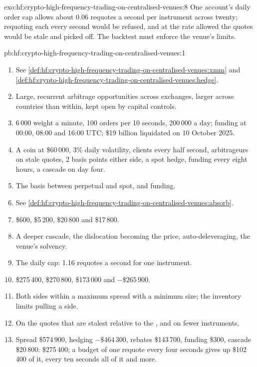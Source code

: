 \begin{solution}{exo:hf:crypto-high-frequency-trading-on-centralised-venues:8}
One account's daily order cap allows about 0.06 requotes a second per instrument across twenty; requoting each every second would be refused, and at
the rate allowed the quotes would be stale and picked off. The backtest must enforce the venue's limits.
\end{solution}

\begin{solution}{pb:hf:crypto-high-frequency-trading-on-centralised-venues:1}
\begin{enumerate}
\item See \cref{def:hf:crypto-high-frequency-trading-on-centralised-venues:xmm} and \cref{def:hf:crypto-high-frequency-trading-on-centralised-venues:hedge}.
\item Large, recurrent arbitrage opportunities across exchanges, larger across countries than within, kept open by capital controls.
\item 6\,000 weight a minute, 100 orders per 10 seconds, 200\,000 a day; funding at 00:00, 08:00 and 16:00 UTC; \$19 billion liquidated on 10 October
2025.
\item A coin at \$60\,000, 3\% daily volatility, clients every half second, arbitrageurs on stale quotes, 2 basis points either side, a spot hedge,
funding every eight hours, a cascade on day four.
\item The basis between perpetual and spot, and funding.
\item See \cref{def:hf:crypto-high-frequency-trading-on-centralised-venues:absorb}.
\item \$600, \$5\,200, \$20\,800 and \$17\,800.
\item A deeper cascade, the dislocation becoming the price, auto-deleveraging, the venue's solvency.
\item The daily cap: 1.16 requotes a second for one instrument.
\item \$275\,400, \$270\,800, \$173\,000 and $-\$265\,900$.
\item Both sides within a maximum spread with a minimum size; the inventory limits pulling a side.
\item On the quotes that are stalest relative to the , and on fewer instruments.
\item Spread \$574\,900, hedging $-\$464\,300$, rebates \$143\,700, funding \$300, cascade \$20\,800: \$275\,400; a budget of one requote every four
seconds gives up \$102\,400 of it, every ten seconds all of it and more.

\end{enumerate}
\end{solution}
